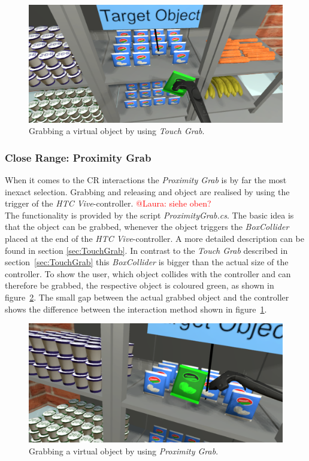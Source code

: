 \begin{figure}[H] 
	\center 
	\includegraphics[width=12cm]{Images/TouchGrab.PNG}			
	\caption[Grabbing a virtual object by using \textit{Touch Grab}.]{Grabbing a virtual object by using \textit{Touch Grab}.}
	\label{fig:touchGrab}
\end{figure}

\subsubsection{Close Range: Proximity Grab} \label{sec:ProximityGrab}
When it comes to the CR interactions the \textit{Proximity Grab} is by far the most inexact selection. Grabbing and releasing and object are realised by using the trigger of the \textit{HTC Vive}-controller. \textcolor{red}{@Laura: siehe oben?}  \\
The functionality is provided by the script \textit{ProximityGrab.cs}. The basic idea is that the object can be grabbed, whenever the object triggers the \textit{BoxCollider} \cite{website:BoxCollider} placed at the end of the \textit{HTC Vive}-controller. A more detailed description can be found in section \ref{sec:TouchGrab}. In contrast to the \textit{Touch Grab} described in section~\ref{sec:TouchGrab} this \textit{BoxCollider} is bigger than the actual size of the controller. To show the user, which object collides with the controller and can therefore be grabbed, the respective object is coloured green, as shown in figure~\ref{fig:proximityGrab}. The small gap between the actual grabbed object and the controller shows the difference between the interaction method shown in figure~\ref{fig:touchGrab}.

\begin{figure}[H] 
	\center 
	\includegraphics[width=12cm]{Images/ProximityGrab.PNG}			
	\caption[Grabbing a virtual object by using \textit{Proximity Grab}.]{Grabbing a virtual object by using \textit{Proximity Grab}.}
	\label{fig:proximityGrab}
\end{figure}


